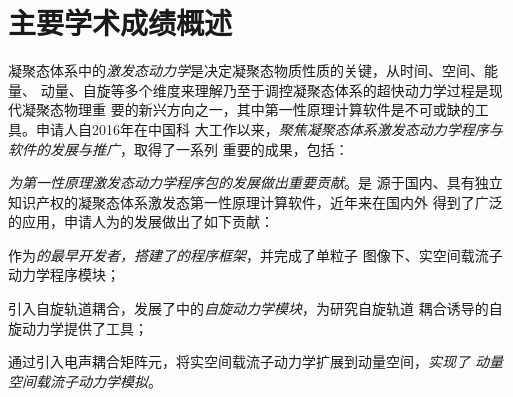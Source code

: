 
\section{主要学术成绩概述}

凝聚态体系中的\emph{激发态动力学}是决定凝聚态物质性质的关键，从时间、空间、能量、
动量、自旋等多个维度来理解乃至于调控凝聚态体系的超快动力学过程是现代凝聚态物理重
要的新兴方向之一，其中第一性原理计算软件是不可或缺的工具。申请人自2016年在中国科
大工作以来，\emph{聚焦凝聚态体系激发态动力学程序与软件的发展与推广}，取得了一系列
重要的成果，包括：
\begin{enumerate}
[
leftmargin=20pt,
label=\textnormal{[\arabic*]}
]
\kaishu{}
  
\item \emph{为第一性原理激发态动力学程序包\hnamd{}的发展做出重要贡献}。\hnamd{}是
  源于国内、具有独立知识产权的凝聚态体系激发态第一性原理计算软件，近年来在国内外
  得到了广泛的应用，申请人为\hnamd{}的发展做出了如下贡献：
  \begin{enumerate*} [label=\textnormal{(\roman*)}]
  \item 作为\emph{\hnamd{}的最早开发者，搭建了\hnamd{}的程序框架}，并完成了单粒子
    图像下、实空间载流子动力学程序模块；
    
  \item 引入自旋轨道耦合，发展了\hnamd{}中的\emph{自旋动力学模块}，为研究自旋轨道
    耦合诱导的自旋动力学提供了工具；
    
  \item 通过引入电声耦合矩阵元，将实空间载流子动力学扩展到动量空间，\emph{实现了
      动量空间载流子动力学模拟}。
    
  \end{enumerate*}

  

\end{enumerate}
